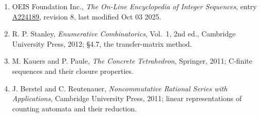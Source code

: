 \documentclass[11pt]{article}
\theoremstyle{definition}
\begin{document}
\begin{enumerate}

\item OEIS Foundation Inc., \emph{The On-Line Encyclopedia of Integer Sequences}, entry \href{https://oeis.org/A224189}{A224189}, revision 8, last modified Oct 03 2025.

\item R. P. Stanley, \emph{Enumerative Combinatorics}, Vol.~1, 2nd ed., Cambridge University Press, 2012; \S4.7, the transfer-matrix method.

\item M. Kauers and P. Paule, \emph{The Concrete Tetrahedron}, Springer, 2011; C-finite sequences and their closure properties.

\item J. Berstel and C. Reutenauer, \emph{Noncommutative Rational Series with Applications}, Cambridge University Press, 2011; linear representations of counting automata and their reduction.

\end{enumerate}
\end{document}

